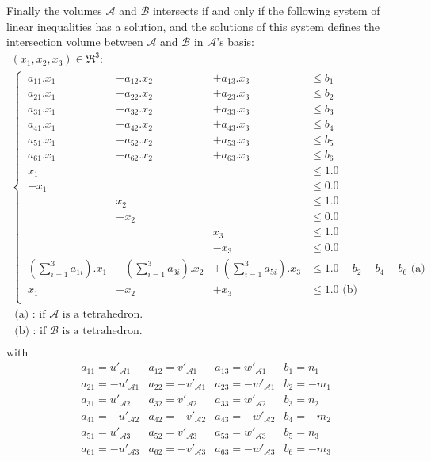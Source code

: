 \documentclass[12pt, a4paper]{article}
\begin{document}
Finally the volumes $\mathcal{A}$ and $\mathcal{B}$ intersects if and only if the following system of linear inequalities has a solution, and the solutions of this system defines the intersection volume between $\mathcal{A}$ and $\mathcal{B}$ in $\mathcal{A}$'s basis:
\begin{equation}
\begin{array}{l}
(x_1, x_2, x_3)\in\Re^3:\\
 \left\{\
\begin{array}{llll}
a_{11}.x_1&+a_{12}.x_2&+a_{13}.x_3 &\le b_1\\
a_{21}.x_1&+a_{22}.x_2&+a_{23}.x_3 &\le b_2\\
a_{31}.x_1&+a_{32}.x_2&+a_{33}.x_3 &\le b_3\\
a_{41}.x_1&+a_{42}.x_2&+a_{43}.x_3 &\le b_4\\
a_{51}.x_1&+a_{52}.x_2&+a_{53}.x_3 &\le b_5\\
a_{61}.x_1&+a_{62}.x_2&+a_{63}.x_3 &\le b_6\\
x_1&& &\le 1.0\\
-x_1&& &\le 0.0\\
&x_2& &\le 1.0\\
&-x_2& &\le 0.0\\
&&x_3 &\le 1.0\\
&&-x_3 &\le 0.0\\
(\sum^3_{i=1}a_{1i}).x_1&+(\sum^3_{i=1}a_{3i}).x_2&+(\sum^3_{i=1}a_{5i}).x_3&\le 1.0-b_2-b_4-b_6\mbox{ (a)}\\
x_1&+x_2&+x_3&\le 1.0\mbox{ (b)}\\
\end{array}
\right.\\
\mbox{ (a) : if $\mathcal{A}$ is a tetrahedron.}\\
\mbox{ (b) : if $\mathcal{B}$ is a tetrahedron.}\\
\end{array}
\end{equation}
with
\begin{equation}
\begin{array}{cccc}
a_{11}=u'_{\mathcal{A}1}&a_{12}=v'_{\mathcal{A}1}&a_{13}=w'_{\mathcal{A}1}&b_{1}=n_1\\
a_{21}=-u'_{\mathcal{A}1}&a_{22}=-v'_{\mathcal{A}1}&a_{23}=-w'_{\mathcal{A}1}&b_{2}=-m_1\\
a_{31}=u'_{\mathcal{A}2}&a_{32}=v'_{\mathcal{A}2}&a_{33}=w'_{\mathcal{A}2}&b_{3}=n_2\\
a_{41}=-u'_{\mathcal{A}2}&a_{42}=-v'_{\mathcal{A}2}&a_{43}=-w'_{\mathcal{A}2}&b_{4}=-m_2\\
a_{51}=u'_{\mathcal{A}3}&a_{52}=v'_{\mathcal{A}3}&a_{53}=w'_{\mathcal{A}3}&b_{5}=n_3\\
a_{61}=-u'_{\mathcal{A}3}&a_{62}=-v'_{\mathcal{A}3}&a_{63}=-w'_{\mathcal{A}3}&b_{6}=-m_3\\
\end{array}
\end{equation}
\end{document}
